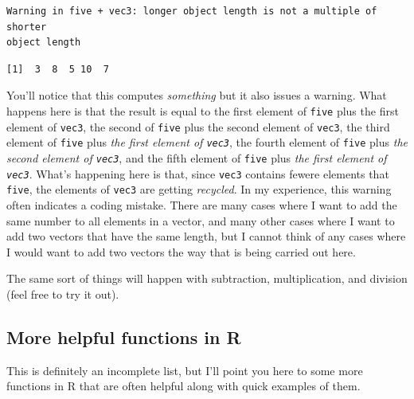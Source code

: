 \documentclass[
  letterpaper,
  DIV=11,
  numbers=noendperiod]{scrreprt}
\begin{document}
\begin{verbatim}
Warning in five + vec3: longer object length is not a multiple of shorter
object length
\end{verbatim}

\begin{verbatim}
[1]  3  8  5 10  7
\end{verbatim}

You'll notice that this computes \emph{something} but it also issues a
warning. What happens here is that the result is equal to the first
element of \texttt{five} plus the first element of \texttt{vec3}, the
second of \texttt{five} plus the second element of \texttt{vec3}, the
third element of \texttt{five} plus \emph{the first element of
\texttt{vec3}}, the fourth element of \texttt{five} plus \emph{the
second element of \texttt{vec3}}, and the fifth element of \texttt{five}
plus \emph{the first element of \texttt{vec3}}. What's happening here is
that, since \texttt{vec3} contains fewere elements that \texttt{five},
the elements of \texttt{vec3} are getting \emph{recycled}. In my
experience, this warning often indicates a coding mistake. There are
many cases where I want to add the same number to all elements in a
vector, and many other cases where I want to add two vectors that have
the same length, but I cannot think of any cases where I would want to
add two vectors the way that is being carried out here.

The same sort of things will happen with subtraction, multiplication,
and division (feel free to try it out).

\subsection{More helpful functions in
R}\label{more-helpful-functions-in-r}

This is definitely an incomplete list, but I'll point you here to some
more functions in R that are often helpful along with quick examples of
them.
\end{document}
